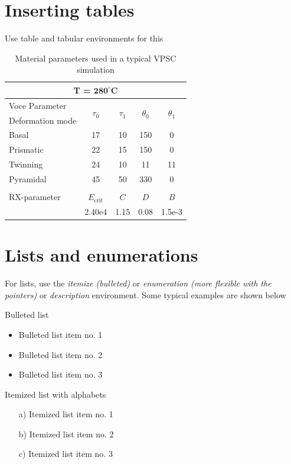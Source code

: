 \documentclass[a4paper,12pt,times]{article} %
\begin{document}
\section{Inserting tables}
Use table and tabular environments for this
\begin{table}[htbp]
 \centering
 \begin{tabular}[c]{|l||c|c|c|c|}
   \hline
   \multicolumn{5}{|c|}{{\bf T = $\mathbf{280}^{\circ}$C}} \\
   \hline
   Voce Parameter & \multirow{2}{*}{$\tau_0$} & \multirow{2}{*}{$\tau_1$} & \multirow{2}{*}{$\theta_0$} & \multirow{2}{*}{$\theta_1$} \\
   \cline{1-1}Deformation mode & & & & \\
   \hline
   Basal     & 17 & 10 & 150 & 0 \\
   Prismatic & 22 & 15 & 150 & 0 \\
   Twinning  & 24 & 10 & 11  & 11 \\
   Pyramidal & 45 & 50 & 330 & 0 \\
   \hline
   & & & & \vspace{-0.5ex}\\
   \hline
   RX-parameter & $E_{\textrm{crit}}$ & $C$ & $D$ & $B$ \\
   \hline
   & 2.40e4 & 1.15 & 0.08 & 1.5e-3\\
   \hline
 \end{tabular}
 \caption{Material parameters used in a typical VPSC simulation}
 \label{tab:MatParams}
\end{table}

\section{Lists and enumerations}
For lists, use the \emph{itemize (bulleted)} or \emph{enumeration (more flexible with the pointers)} or \emph{description} environment. Some typical examples are shown below

\noindent %
Bulleted list
\begin{itemize}
 \item Bulleted list item no. 1
 \item Bulleted list item no. 2
 \item Bulleted list item no. 3
\end{itemize}

\noindent
Itemized list with alphabets
\begin{itemize}
 \item[a)] Itemized list item no. 1
 \item[b)] Itemized list item no. 2
 \item[c)] Itemized list item no. 3
\end{itemize}
\end{document}
